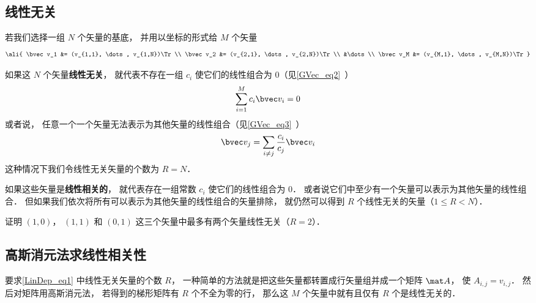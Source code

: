 

\subsection{线性无关}

若我们选择一组 $N$ 个矢量的基底， 并用以坐标的形式给 $M$ 个矢量
\begin{equation}\label{LinDep_eq1}
\ali{
\bvec v_1 &= (v_{1,1}, \dots, v_{1,N})\Tr \\
\bvec v_2 &= (v_{2,1}, \dots, v_{2,N})\Tr \\
&\dots \\
\bvec v_M &= (v_{M,1}, \dots, v_{M,N})\Tr
}\end{equation}

如果这 $N$ 个矢量\textbf{线性无关}， 就代表不存在一组 $c_i$ 使它们的线性组合为 0（见\autoref{GVec_eq2}~）
\begin{equation}
\sum_{i=1}^M c_i\bvec v_i = 0
\end{equation}
或者说， 任意一个一个矢量无法表示为其他矢量的线性组合（见\autoref{GVec_eq3}~）%
\begin{equation}
\bvec v_j = \sum_{i \ne j}\frac{c_i}{c_j} \bvec v_i
\end{equation}
这种情况下我们令线性无关矢量的个数为 $R = N$．

如果这些矢量是\textbf{线性相关的}， 就代表存在一组常数 $c_i$ 使它们的线性组合为 0． 或者说它们中至少有一个矢量可以表示为其他矢量的线性组合． 但如果我们依次将所有可以表示为其他矢量的线性组合的矢量排除， 就仍然可以得到  $R$ 个线性无关的矢量（$1 \leqslant R < N$）．

\begin{exercise}{}
证明 $(1,0)$， $(1,1)$ 和 $(0,1)$ 这三个矢量中最多有两个矢量线性无关（$R = 2$）．
\end{exercise}

\subsection{高斯消元法求线性相关性}
要求\autoref{LinDep_eq1} 中线性无关矢量的个数 $R$， 一种简单的方法就是把这些矢量都转置成行矢量组并成一个矩阵 $\mat A$， 使 $A_{i,j} = v_{i,j}$． 然后对矩阵用高斯消元法， 若得到的梯形矩阵有 $R$ 个不全为零的行， 那么这 $M$ 个矢量中就有且仅有 $R$ 个是线性无关的．





 